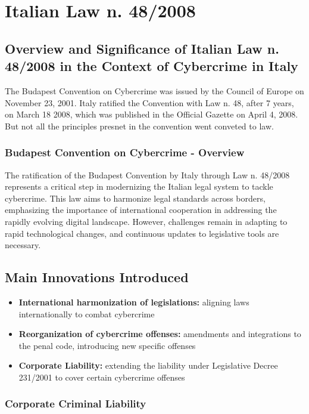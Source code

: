 \chapter{Italian Law n. 48/2008}

\section{Overview and Significance of Italian Law n. 48/2008 in the Context of Cybercrime in Italy}

The Budapest Convention on Cybercrime was issued by the Council of Europe on November 23, 2001. Italy ratified the Convention with Law n. 48, after 7 years, on March 18 2008, which was published in the Official Gazette on April 4, 2008. But not all the principles presnet in the convention went conveted to law.


\subsection{Budapest Convention on Cybercrime - Overview}

The ratification of the Budapest Convention by Italy through Law n. 48/2008 represents a critical step in modernizing the Italian legal system to tackle cybercrime. This law aims to harmonize legal standards across borders, emphasizing the importance of international cooperation in addressing the rapidly evolving digital landscape. However, challenges remain in adapting to rapid technological changes, and continuous updates to legislative tools are necessary.

\section{Main Innovations Introduced}

\begin{itemize}[itemsep=0pt]
    \item \textbf{International harmonization of legislations:} aligning laws internationally to combat cybercrime
    \item \textbf{Reorganization of cybercrime offenses:} amendments and integrations to the penal code, introducing new specific offenses
    \item \textbf{Corporate Liability:} extending the liability under Legislative Decree 231/2001 to cover certain cybercrime offenses
\end{itemize}

\subsection{Corporate Criminal Liability}

